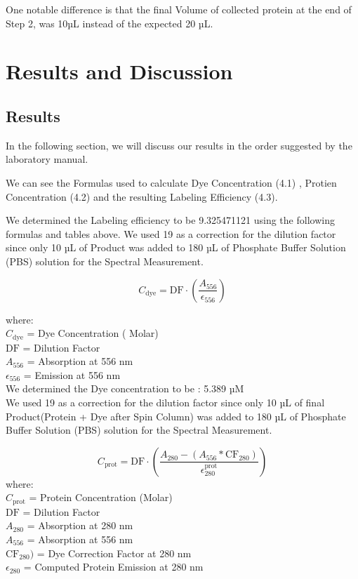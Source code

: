 \documentclass[a4paper,english,12pt,bibliography=totoc]{scrreprt}
\begin{document}
One notable difference is that the final Volume of collected protein at the end of Step 2, was 10µL instead of the expected 20 µL.

\chapter{Results and Discussion}
\label{cha:ResandDisc}

\section{Results}
\label{sec:material}
In the following section, we will discuss our results in the order suggested by the laboratory manual. 

We can see the Formulas used to calculate Dye Concentration (4.1) , Protien Concentration (4.2) and the resulting Labeling Efficiency (4.3).

We determined the Labeling efficiency to be 9.325471121 using the following formulas and tables above.
We used 19 as a correction for the dilution factor since only 10 µL of Product was added to 180 µL of Phosphate Buffer Solution (PBS) solution for the Spectral Measurement.

\begin{equation}
    C_{\text{dye}} = \text{DF} \cdot \left( \frac{A_{556}}{\epsilon_{556}} \right)
\end{equation}

where:\\
$C_{\text{dye}}$ = Dye Concentration ( Molar) \\
$\text{DF}$ = Dilution  Factor\\
$A_{556}$ = Absorption at 556 nm\\
$\epsilon_{556}$ = Emission at 556 nm\\


We determined the Dye concentration to be : 5.389 µM\\

We used 19 as a correction for the dilution factor since only 10 µL of final Product(Protein + Dye after Spin Column) was added to 180 µL of Phosphate Buffer Solution (PBS) solution for the Spectral Measurement.


\begin{equation}
    C_{\text{prot}} = \text{DF} \cdot \left( \frac{A_{280} - (A_{556} * \text{CF}_{280})}{\epsilon_{280}^{\text{prot}}} \right)
\end{equation}
where:\\
$ C_{\text{prot}}$ =  Protein Concentration (Molar)\\
$\text{DF}$ = Dilution  Factor\\
$A_{280}$ = Absorption at 280 nm\\
$A_{556}$ = Absorption at 556 nm\\
$ \text{CF}_{280})$ = Dye Correction Factor at 280 nm\\
$\epsilon_{280}$ = Computed Protein Emission at 280 nm\\
\end{document}
